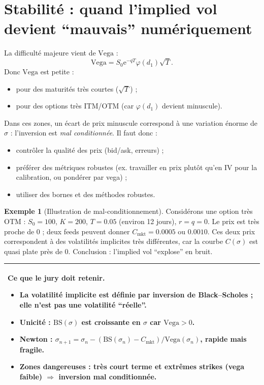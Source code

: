 \documentclass[11pt,a4paper]{report}
\newcommand{\ee}{\mathrm{e}}
\newcommand{\1}{\mathbbm{1}}
\newcommand{\BS}{\mathrm{BS}}
\newcommand{\vega}{\mathrm{Vega}}
\theoremstyle{definition}
\newtheorem{example}{Exemple}[chapter]
\theoremstyle{plain}
\theoremstyle{remark}
\newenvironment{jurybox}{%
  \begin{center}
  \setlength{\tabcolsep}{6pt}%
  \renewcommand{\arraystretch}{1.1}%
  \begin{tabular}{|p{0.94\textwidth}|}
  \hline
  \small\textbf{Ce que le jury doit retenir.}\par\medskip
}{%
  \\ \hline
  \end{tabular}
  \end{center}
}
\begin{document}
\section{Stabilité : quand l'implied vol devient ``mauvais'' numériquement}
La difficulté majeure vient de $\vega$ :
\[
\vega = S_0\ee^{-qT}\varphi(d_1)\sqrt{T}.
\]
Donc $\vega$ est petite :
\begin{itemize}
  \item pour des maturités très courtes ($\sqrt{T}$) ;
  \item pour des options très ITM/OTM (car $\varphi(d_1)$ devient minuscule).
\end{itemize}
Dans ces zones, un écart de prix minuscule correspond à une variation énorme de $\sigma$ : l'inversion est \emph{mal conditionnée}.
Il faut donc :
\begin{itemize}
  \item contrôler la qualité des prix (bid/ask, erreurs) ;
  \item préférer des métriques robustes (ex. travailler en prix plutôt qu'en IV pour la calibration, ou pondérer par vega) ;
  \item utiliser des bornes et des méthodes robustes.
\end{itemize}

\begin{example}[Illustration de mal-conditionnement]
Considérons une option très OTM : $S_0=100$, $K=200$, $T=0.05$ (environ 12 jours), $r=q=0$.
Le prix est très proche de 0 ; deux feeds peuvent donner $C_{\mathrm{mkt}}=0.0005$ ou $0.0010$.
Ces deux prix correspondent à des volatilités implicites très différentes, car la courbe $C(\sigma)$ est quasi plate près de 0.
Conclusion : l'implied vol ``explose'' en bruit.
\end{example}

\begin{jurybox}
\begin{itemize}
\item La volatilité implicite est définie par inversion de Black--Scholes ; elle n'est pas une volatilité ``réelle''.
\item Unicité : $\BS(\sigma)$ est croissante en $\sigma$ car $\vega>0$.
\item Newton : $\sigma_{n+1}=\sigma_n-(\BS(\sigma_n)-C_{\mathrm{mkt}})/\vega(\sigma_n)$, rapide mais fragile.
\item Zones dangereuses : très court terme et extrêmes strikes (vega faible) $\Rightarrow$ inversion mal conditionnée.
\end{itemize}
\end{jurybox}
\end{document}
